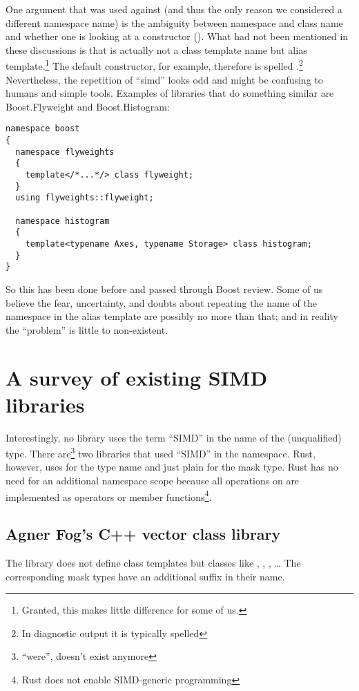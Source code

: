 One argument that was used against \stdsimd{} (and thus the only reason we considered a
different namespace name) is the ambiguity between namespace and class
name and whether one is looking at a constructor ().
What had not been mentioned in these discussions is that  is actually not a class
template name but alias template.\footnote{Granted, this makes little difference for some of us.}
The default constructor, for example, therefore is spelled
\stdsimd{}.\footnote{In diagnostic output it is typically spelled
\stdsimd{}}
Nevertheless, the repetition of “simd” looks odd and might be confusing to humans and simple tools.
Examples of libraries that do something similar are Boost.Flyweight and Boost.Histogram:
\medskip\begin{lstlisting}[style=Vc]
namespace boost
{
  namespace flyweights
  {
    template</*...*/> class flyweight;
  }
  using flyweights::flyweight;

  namespace histogram
  {
    template<typename Axes, typename Storage> class histogram;
  }
}
\end{lstlisting}
So this has been done before and passed through Boost review.
Some of us believe the fear, uncertainty, and doubts about repeating the name of the namespace in
the alias template are possibly no more than that; and in reality the “problem” is little to
non-existent.

\section{A survey of existing SIMD libraries}

Interestingly, no \CC{} library uses the term “SIMD” in the name of the (unqualified) type.
There are\footnote{“were”,  doesn't exist anymore} two libraries that used “SIMD”
in the namespace.
Rust, however, uses  for the type name and just plain  for the mask type.
Rust has no need for an additional namespace scope because all operations on  are
implemented as operators or member functions\footnote{Rust does not enable SIMD-generic
programming}.

\subsection{Agner Fog's C++ vector class library}

The library does not define class templates but classes like , ,
, \ldots
The corresponding mask types have an additional  suffix in their name.

